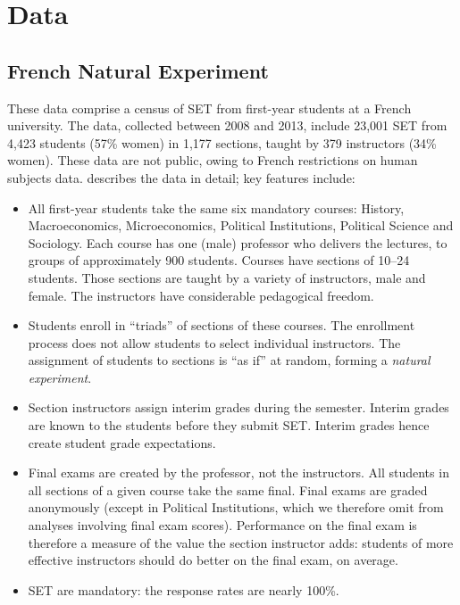\documentclass[12pt]{article}
\begin{document}
\section{Data}
\subsection{French Natural Experiment}
These data comprise a census of SET from first-year students at a French university.
The data, collected between 2008 and 2013, include 23,001 SET from
4,423 students (57\% women) in 1,177
sections, taught by 379 instructors (34\% women). 
These data are not public, owing to French restrictions on human subjects data.
\citet{Boring2015} describes the data in detail; key features include:
\begin{itemize}
   \item All first-year students take the same six mandatory courses: 
            History, Macroeconomics, Microeconomics, 
            Political Institutions, Political Science and Sociology.
            Each course has one (male) professor
            who delivers the lectures, to groups of approximately 900 students. 
            Courses have sections of 10--24 students. 
            Those sections are taught by a variety of instructors, male and female.
            The instructors have considerable pedagogical freedom.
    
   \item Students enroll in ``triads'' of sections of these courses. 
            The enrollment process
            does not allow students to select individual instructors.
            The assignment of students to sections is ``as if'' at random,
            forming a \emph{natural experiment}.
            
   \item Section instructors assign interim grades during the semester.
            Interim grades are known to the students before they submit SET.
            Interim grades hence create student grade expectations.
            
   \item Final exams are created by the professor, not the instructors.
            All students in all sections of a given course take the same final.
            Final exams are graded anonymously (except in Political
            Institutions, which we therefore omit from analyses involving final exam scores).
            Performance on the final exam is therefore a measure of the value the
            section instructor adds: students of more effective instructors should do better on
            the final exam, on average.
    
   \item SET are mandatory: the response rates are nearly 100\%.
   
\end{itemize}
\end{document}
